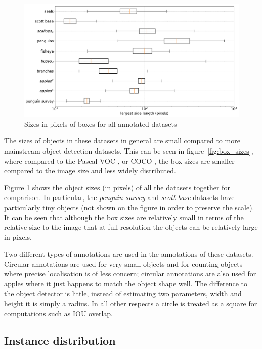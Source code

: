 \begin{figure}[ht]
\centering
\includegraphics[width=1.0\linewidth]{charts/summaries/sizes_boxplot.pdf}
\caption{ Sizes in pixels of boxes for all annotated datasets }
\label{fig:box_sizes_plot}
\end{figure}

The sizes of objects in these datasets in general are small compared to more mainstream object detection datasets. This can be seen in figure~\ref{fig:box_sizes}, where compared to the Pascal VOC \cite{Everingham2008}, or COCO \cite{Lin2014}, the box sizes are smaller compared to the image size and less widely distributed. 

Figure \ref{fig:box_sizes_plot}  shows the object sizes (in pixels) of all the datasets together for comparison. In particular, the \emph{penguin survey} and \emph{scott base} datasets have particularly tiny objects (not shown on the figure in order to preserve the scale). It can be seen that although the box sizes are relatively small in terms of the relative size to the image that at full resolution the objects can be relatively large in pixels.

Two different types of annotations are used in the annotations of these datasets. Circular annotations are used for very small objects and for counting objects where precise localisation is of less concern; circular annotations are also used for apples where it just happens to match the object shape well. The difference to the object detector is little, instead of estimating two parameters, width and height it is simply a radius. In all other respects a circle is treated as a square for computations such as \gls{IOU} overlap.

\subsection {Instance distribution}

